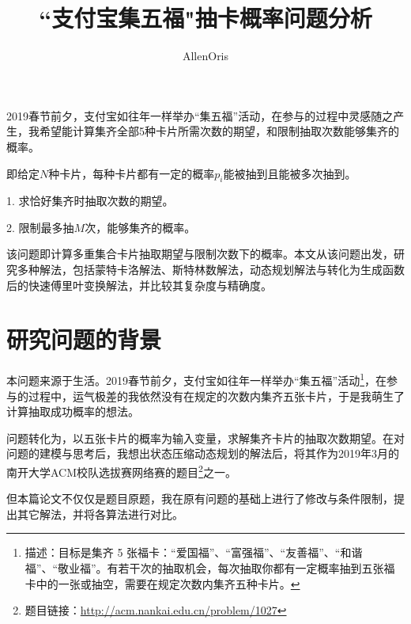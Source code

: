 \documentclass[master]{thesis-uestc}
\title{``支付宝集五福"抽卡概率问题分析}
\author{AllenOris}
\begin{document}
\begin{chineseabstract}
    

    2019春节前夕，支付宝如往年一样举办“集五福”活动，在参与的过程中灵感随之产生，我希望能计算集齐全部5种卡片所需次数的期望，和限制抽取次数能够集齐的概率。
    
    即给定$N$种卡片，每种卡片都有一定的概率$p_i$能被抽到且能被多次抽到。
    
    1. 求恰好集齐时抽取次数的期望。

    2. 限制最多抽$M$次，能够集齐的概率。

    该问题即计算多重集合卡片抽取期望与限制次数下的概率。本文从该问题出发，研究多种解法，包括蒙特卡洛解法、斯特林数解法，动态规划解法与转化为生成函数后的快速傅里叶变换解法，并比较其复杂度与精确度。

\end{chineseabstract}

\thesistableofcontents

\thesischapterexordium

\section{研究问题的背景}

本问题来源于生活。2019春节前夕，支付宝如往年一样举办“集五福”活动\footnote{描述：目标是集齐 5 张福卡：“爱国福”、“富强福”、“友善福”、“和谐福”、“敬业福”。有若干次的抽取机会，每次抽取你都有一定概率抽到五张福卡中的一张或抽空，需要在规定次数内集齐五种卡片。}，在参与的过程中，运气极差的我依然没有在规定的次数内集齐五张卡片，于是我萌生了计算抽取成功概率的想法。

问题转化为，以五张卡片的概率为输入变量，求解集齐卡片的抽取次数期望。在对问题的建模与思考后，我想出状态压缩动态规划的解法后，将其作为2019年3月的南开大学ACM校队选拔赛网络赛的题目\footnote{题目链接：\url{http://acm.nankai.edu.cn/problem/1027}}之一。

但本篇论文不仅仅是题目原题，我在原有问题的基础上进行了修改与条件限制，提出其它解法，并将各算法进行对比。


\end{document}
